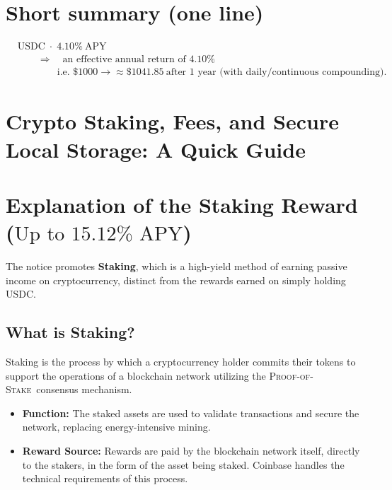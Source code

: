 \documentclass{article}
\newcommand{\pos}{\textsc{Proof-of-Stake}}
\newcommand{\usdc}{\textsc{USDC}}
\begin{document}
\bigskip

\section*{Short summary (one line)}
\begin{align*}
    &\text{USDC}\;\cdot\;4.10\%\ \text{APY} \\
    &\qquad\Rightarrow\quad \text{an effective annual return of } 4.10\% \\
    &\qquad\qquad\text{i.e. } \$1000 \to \approx \$1041.85\ \text{after 1 year (with daily/continuous compounding).}
\end{align*}



\newpage

\section*{Crypto Staking, Fees, and Secure Local Storage: A Quick Guide}


\section*{Explanation of the Staking Reward ($\text{Up to } 15.12\% \text{ APY}$)}

\noindent The notice  promotes \textbf{Staking}, 
which is a high-yield method of earning passive income on 
cryptocurrency, distinct from the rewards earned on simply holding \usdc.

\subsection*{What is Staking?}

\noindent Staking is the process by which a cryptocurrency holder commits their tokens to support the operations of a blockchain network utilizing the \pos\ consensus mechanism.

\begin{itemize}
  \item \textbf{Function:} The staked assets are used to validate transactions and secure the network, replacing energy-intensive mining.
  \item \textbf{Reward Source:} Rewards are paid by the blockchain network itself, directly to the stakers, in the form of the asset being staked. Coinbase handles the technical requirements of this process.
\end{itemize}
\end{document}
